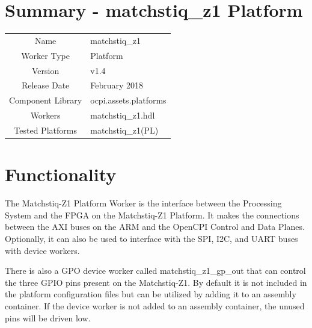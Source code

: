 \documentclass{article}
\author{} %
\date{Version \docVersion} %
\title{\docTitle}
\def\docVersion{1.4}
\def\comp{matchstiq\_z1}
\def\Comp{matchstiq\_z1 Platform}
\begin{document}
\section*{Summary - \Comp}
\begin{tabular}{|c|M{13.5cm}|}
	\hline
	                  &                                                    \\
	\hline
	Name              & \comp                                              \\
	\hline
	Worker Type       & Platform                                           \\
	\hline
	Version           & v\docVersion \\
	\hline
	Release Date      & February 2018 \\
	\hline
	Component Library & ocpi.assets.platforms \\
	\hline
	Workers & \comp.hdl \\
	\hline
	Tested Platforms  & matchstiq\_z1(PL) \\
	\hline
\end{tabular}

\section*{Functionality}
\begin{flushleft}
The Matchstiq-Z1 Platform Worker is the interface between the Processing System and the FPGA on the Matchstiq-Z1 Platform. It makes the connections between the AXI buses on the ARM and the OpenCPI Control and Data Planes. Optionally, it can also be used to interface with the SPI, I2C, and UART buses with device workers. \newline

There is also a GPO device worker called matchstiq\_z1\_gp\_out that can control the three GPIO pins present on the Matchstiq-Z1. By default it is not included in the platform configuration files but can be utilized by adding it to an assembly container. If the device worker is not added to an assembly container, the unused pins will be driven low.

\end{flushleft}
\end{document}
